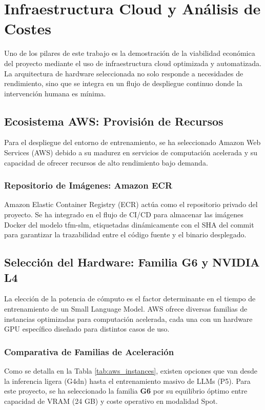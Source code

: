 \section{Infraestructura Cloud y Análisis de Costes}
\label{sec:infraestructura}

Uno de los pilares de este trabajo es la demostración de la viabilidad económica del proyecto mediante el uso de infraestructura cloud optimizada y automatizada. La arquitectura de hardware seleccionada no solo responde a necesidades de rendimiento, sino que se integra en un flujo de despliegue continuo donde la intervención humana es mínima.

\subsection{Ecosistema AWS: Provisión de Recursos}
Para el despliegue del entorno de entrenamiento, se ha seleccionado Amazon Web Services (AWS) debido a su madurez en servicios de computación acelerada y su capacidad de ofrecer recursos de alto rendimiento bajo demanda.

\subsubsection{Repositorio de Imágenes: Amazon ECR}
Amazon Elastic Container Registry (ECR) actúa como el repositorio privado del proyecto. Se ha integrado en el flujo de CI/CD para almacenar las imágenes Docker del modelo tfm-slm, etiquetadas dinámicamente con el SHA del commit para garantizar la trazabilidad entre el código fuente y el binario desplegado.

\subsection{Selección del Hardware: Familia G6 y NVIDIA L4}
La elección de la potencia de cómputo es el factor determinante en el tiempo de entrenamiento de un Small Language Model. AWS ofrece diversas familias de instancias optimizadas para computación acelerada, cada una con un hardware GPU específico diseñado para distintos casos de uso.

\subsubsection{Comparativa de Familias de Aceleración}
Como se detalla en la Tabla \ref{tab:aws_instances}, existen opciones que van desde la inferencia ligera (G4dn) hasta el entrenamiento masivo de LLMs (P5). Para este proyecto, se ha seleccionado la familia \textbf{G6} por su equilibrio óptimo entre capacidad de VRAM (24 GB) y coste operativo en modalidad Spot.


